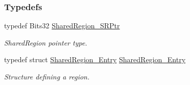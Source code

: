 \subsubsection*{Typedefs}
\begin{DoxyCompactItemize}
\item 
typedef Bits32 \hyperlink{_shared_region_8h_a3efe06da0fa1fcbb3b271278ddd9b410}{SharedRegion\_\-SRPtr}
\begin{DoxyCompactList}\small\item\em SharedRegion pointer type. \item\end{DoxyCompactList}\item 
typedef struct \hyperlink{struct_shared_region___entry}{SharedRegion\_\-Entry} \hyperlink{_shared_region_8h_aadc9f7e3da237ebfbefeb2edfc87732d}{SharedRegion\_\-Entry}
\begin{DoxyCompactList}\small\item\em Structure defining a region. \item\end{DoxyCompactList}\end{DoxyCompactItemize}
